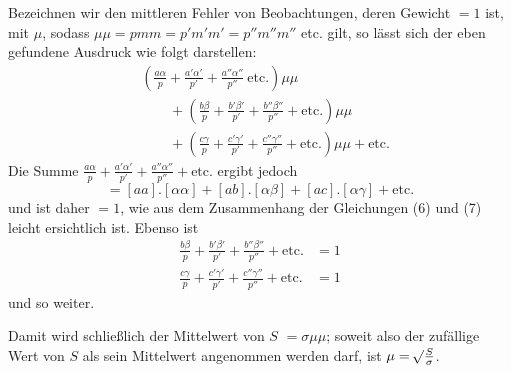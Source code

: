 Bezeichnen wir den mittleren Fehler von Beobachtungen, deren Gewicht \(=1\) ist, mit \(\mu\), sodass \(\mu\mu=pmm=p'm'm'=p''m''m''\) etc. gilt, so lässt sich der eben gefundene Ausdruck wie folgt darstellen:
\[
\begin{aligned}
&\left(\frac{a\alpha}{p}+\frac{a'\alpha'}{p'}+\frac{a''\alpha''}{p''}\ \text{etc.}\right)\mu\mu
\\&\qquad+\left(\frac{b\beta}{p}+\frac{b'\beta'}{p'}+\frac{b''\beta''}{p''}+\text{etc.}\right)\mu\mu\\
&\qquad+\left(\frac{c\gamma}{p}+\frac{c'\gamma'}{p'}+\frac{c''\gamma''}{p''}+\text{etc.}\right)\mu\mu+\text{etc.}
\end{aligned}
\]
Die Summe \(\frac{a\alpha}{p}+\frac{a'\alpha'}{p'}+\frac{a''\alpha''}{p''}+\text{etc.}\) ergibt jedoch
\[
=[aa].[\alpha\alpha]+[ab].[\alpha\beta]+[ac].[\alpha\gamma]+\text{etc.}
\]
und ist daher \(=1\), wie aus dem Zusammenhang der Gleichungen (6) und (7) leicht ersichtlich ist. Ebenso ist
\[
\begin{aligned}
\frac{b\beta}{p}+\frac{b'\beta'}{p'}+\frac{b''\beta''}{p''}+\text{etc.}&=1\\[5pt]
\frac{c\gamma}{p}+\frac{c'\gamma'}{p'}+\frac{c''\gamma''}{p''}+\text{etc.}&=1
\end{aligned}
\]
und so weiter.

Damit wird schließlich der Mittelwert von \(S\) \(=\sigma\mu\mu\); soweit also der zufällige Wert von \(S\) als sein Mittelwert angenommen werden darf, ist \(\mu=\mathord{{}^{}\!\surd}\frac S\sigma\).

\clearpage
